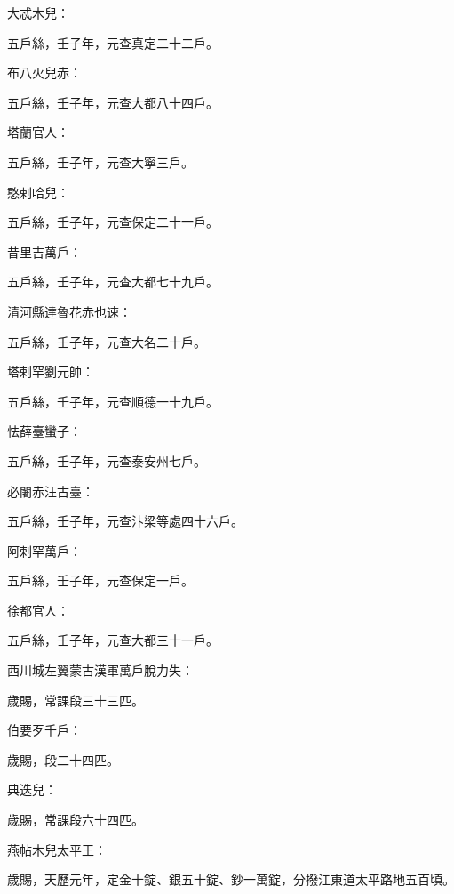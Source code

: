 \begin{pinyinscope}
 大忒木兒：



 五戶絲，壬子年，元查真定二十二戶。



 布八火兒赤：



 五戶絲，壬子年，元查大都八十四戶。



 塔蘭官人：



 五戶絲，壬子年，元查大寧三戶。



 憨剌哈兒：



 五戶絲，壬子年，元查保定二十一戶。



 昔里吉萬戶：



 五戶絲，壬子年，元查大都七十九戶。



 清河縣達魯花赤也速：



 五戶絲，壬子年，元查大名二十戶。



 塔剌罕劉元帥：



 五戶絲，壬子年，元查順德一十九戶。



 怯薛臺蠻子：



 五戶絲，壬子年，元查泰安州七戶。



 必闍赤汪古臺：



 五戶絲，壬子年，元查汴梁等處四十六戶。



 阿剌罕萬戶：



 五戶絲，壬子年，元查保定一戶。



 徐都官人：



 五戶絲，壬子年，元查大都三十一戶。



 西川城左翼蒙古漢軍萬戶脫力失：



 歲賜，常課段三十三匹。



 伯要歹千戶：



 歲賜，段二十四匹。



 典迭兒：



 歲賜，常課段六十四匹。



 燕帖木兒太平王：



 歲賜，天歷元年，定金十錠、銀五十錠、鈔一萬錠，分撥江東道太平路地五百頃。



\end{pinyinscope}